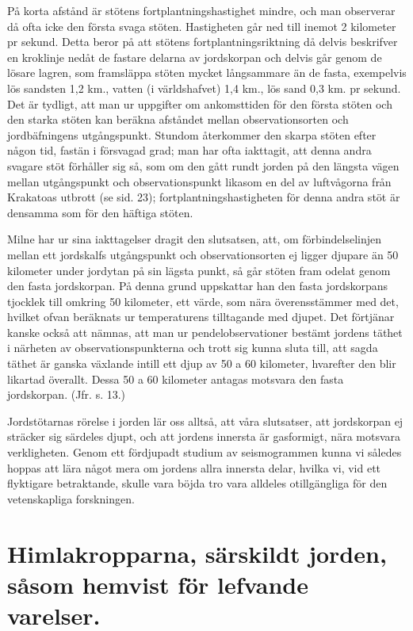 \documentclass[a4paper, 12pt, oneside, swedish]{article}
\begin{document}
På korta afstånd är stötens fortplantningshastighet mindre, och man observerar då ofta icke den första svaga stöten. Hastigheten går ned till inemot 2 kilometer pr sekund. Detta beror på att stötens fortplantningsriktning då delvis beskrifver en kroklinje nedåt de fastare delarna av jordskorpan och delvis går genom de lösare lagren, som framsläppa stöten mycket långsammare än de fasta, exempelvis lös sandsten 1,2 km., vatten (i världshafvet) 1,4 km., lös sand 0,3 km. pr sekund. Det är tydligt, att man ur uppgifter om ankomsttiden för den första stöten och den starka stöten kan beräkna afståndet mellan observationsorten och jordbäfningens utgångspunkt. Stundom återkommer den skarpa stöten efter någon tid, fastän i försvagad grad; man har ofta iakttagit, att denna andra svagare stöt förhåller sig så, som om den gått rundt jorden på den längsta vägen mellan utgångspunkt och observationspunkt likasom en del av luftvågorna från Krakatoas utbrott (se sid. 23); fortplantningshastigheten för denna andra stöt är densamma som för den häftiga stöten.

Milne har ur sina iakttagelser dragit den slutsatsen, att, om förbindelselinjen mellan ett jordskalfs utgångspunkt och observationsorten ej ligger djupare än 50 kilometer under jordytan på sin lägsta punkt, så går stöten fram odelat genom den fasta jordskorpan. På denna grund uppskattar han den fasta jordskorpans tjocklek till omkring 50 kilometer, ett värde, som nära överensstämmer med det, hvilket ofvan beräknats ur temperaturens tilltagande med djupet. Det förtjänar kanske också att nämnas, att man ur pendelobservationer bestämt jordens täthet i närheten av observationspunkterna och trott sig kunna sluta till, att sagda täthet är ganska växlande intill ett djup av 50 a 60 kilometer, hvarefter den blir likartad överallt. Dessa 50 a 60 kilometer antagas motsvara den fasta jordskorpan. (Jfr. s. 13.)

Jordstötarnas rörelse i jorden lär oss alltså, att våra slutsatser, att jordskorpan ej sträcker sig särdeles djupt, och att jordens innersta är gasformigt, nära motsvara verkligheten. Genom ett fördjupadt studium av seismogrammen kunna vi således hoppas att lära något mera om jordens allra innersta delar, hvilka vi, vid ett flyktigare betraktande, skulle vara böjda tro vara alldeles otillgängliga för den vetenskapliga forskningen.
\clearpage
\section{Himlakropparna, särskildt jorden, såsom hemvist för lefvande varelser.}
\end{document}
